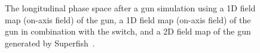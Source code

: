 \begin{figure}[tb]
\centering
{}
 \caption{The longitudinal phase space after a gun simulation using a 1D field map (on-axis field) of the gun, a 1D field map
   (on-axis field) of the gun in combination with the  switch, and a 2D field map of the gun generated by
   Superfish~\cite{superfish}.}
\label{fig:fieldnoiseexample}

\end{figure}


